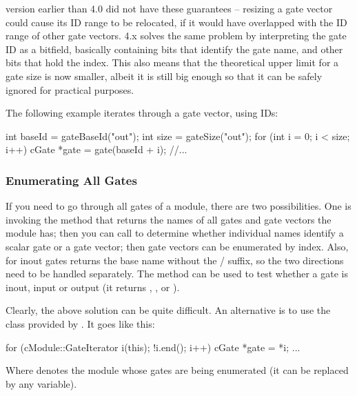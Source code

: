 \begin{ned}
\begin{note}
    {\opp} version earlier than 4.0 did not have these guarantees -- resizing
    a gate vector could cause its ID range to be relocated, if it
    would have overlapped with the ID range of other gate vectors.
    {\opp} 4.x solves the same problem by interpreting the gate ID
    as a bitfield, basically containing bits that identify the gate name,
    and other bits that hold the index. This also means that the theoretical
    upper limit for a gate size is now smaller, albeit it is still
    big enough so that it can be safely ignored for practical purposes.
\end{note}

The following example iterates through a gate vector, using IDs:

\begin{cpp}
int baseId = gateBaseId("out");
int size = gateSize("out");
for (int i = 0; i < size; i++) {
    cGate *gate = gate(baseId + i);
    //...
}
\end{cpp}


\subsubsection{Enumerating All Gates}
\label{sec:simple-modules:enumerating-gates}

If you need to go through all gates of a module, there are
two possibilities. One is invoking the  method
that returns the names of all gates and gate vectors the module
has; then you can call  to determine
whether individual names identify a scalar gate or a gate vector;
then gate vectors can be enumerated by index. Also, for inout
gates  returns the base name without the
/ suffix, so the two directions
need to be handled separately. The  method
can be used to test whether a gate is inout, input or output
(it returns , , or
).

Clearly, the above solution can be quite difficult. An alternative is to use
the  class provided by .
It goes like this:

\begin{cpp}
for (cModule::GateIterator i(this); !i.end(); i++) {
    cGate *gate = *i;
    ...
}
\end{cpp}

Where  denotes the module whose gates are being enumerated
(it can be replaced by any  variable).


\end{ned}
